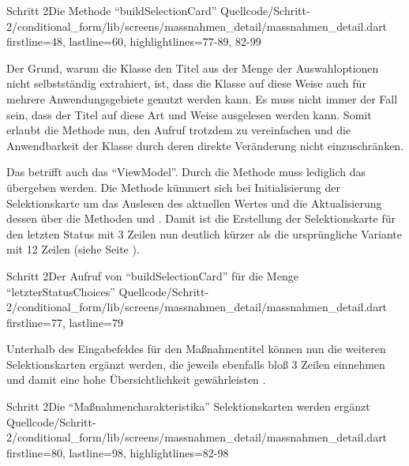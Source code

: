 \begin{alexlisting}{Schritt 2}{Die Methode \enquote{buildSelectionCard}}
  {Quellcode/Schritt-2/conditional_form/lib/screens/massnahmen_detail/massnahmen_detail.dart}
  {firstline=48, lastline=60, highlightlines={77-89, 82-99}}
  \label{lst:Schritt2MassnahmencharakteristikaSelektionskartenWerdenErgaenzt}
\end{alexlisting}

Der Grund, warum die Klasse  den Titel aus der Menge der Auswahloptionen nicht selbstständig extrahiert, ist, dass die Klasse auf diese Weise auch für mehrere Anwendungsgebiete genutzt werden kann.
Es muss nicht immer der Fall sein, dass der Titel auf diese Art und Weise ausgelesen werden kann.
Somit erlaubt die Methode  nun, den Aufruf trotzdem zu vereinfachen und die Anwendbarkeit der Klasse  durch deren direkte Veränderung nicht einzuschränken.

Das betrifft auch das \enquote{ViewModel}.
Durch die Methode  muss lediglich das  übergeben werden.
Die Methode kümmert sich bei Initialisierung der Selektionskarte um das Auslesen des aktuellen Wertes  und die Aktualisierung dessen über die Methoden   und  .
Damit ist die Erstellung der Selektionskarte für den letzten Status mit 3 Zeilen \Lst{\ref{lst:Schritt2BuildSelectionCardLetzterStatusChoices}} nun deutlich kürzer als die ursprüngliche Variante mit 12 Zeilen (siehe Seite \pageref{lst:Schritt1AusgabeDerFormularfelder}).

\begin{alexlisting}{Schritt 2}{Der Aufruf von \enquote{buildSelectionCard} für die Menge \enquote{letzterStatusChoices}}
  {Quellcode/Schritt-2/conditional_form/lib/screens/massnahmen_detail/massnahmen_detail.dart}
  {firstline=77, lastline=79}
  \label{lst:Schritt2BuildSelectionCardLetzterStatusChoices}
\end{alexlisting}

Unterhalb des Eingabefeldes für den Maßnahmentitel können nun die weiteren Selektionskarten ergänzt werden, die jeweils ebenfalls bloß 3 Zeilen einnehmen und damit eine hohe Übersichtlichkeit gewährleisten .

\begin{alexlisting}{Schritt 2}{Die \enquote{Maßnahmencharakteristika} Selektionskarten werden ergänzt}
  {Quellcode/Schritt-2/conditional_form/lib/screens/massnahmen_detail/massnahmen_detail.dart}
  {firstline=80, lastline=98, highlightlines={82-98}}
  \label{lst:Schritt2MassnahmencharakteristikaSelektionskartenWerdenErgaenzt}
\end{alexlisting}

